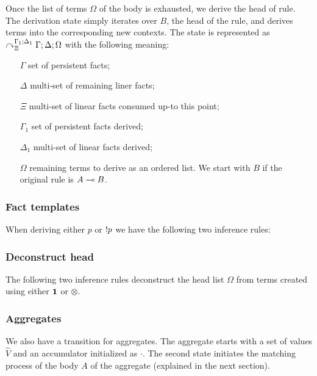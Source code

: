 Once the list of terms $\Omega$ of the body is exhausted, we derive the head of
rule.  The derivation state simply iterates over $B$, the head of the rule, and
derives terms into the corresponding new contexts. The state is represented as
$\curvearrowright_{\Xi}^{\Gamma_1; \Delta_1} \Gamma; \Delta; \Omega$ with the following meaning:

\begin{enumerate}
   \item[$\Gamma$] set of persistent facts;

   \item[$\Delta$] multi-set of remaining liner facts;

   \item[$\Xi$] multi-set of linear facts consumed up-to this point;

   \item[$\Gamma_1$] set of persistent facts derived;

   \item[$\Delta_1$] multi-set of linear facts derived;

   \item[$\Omega$] remaining terms to derive as an ordered list. We start with
   $B$ if the original rule is $A \multimap B$.

\end{enumerate}

\subsubsection{Fact templates}

When deriving either $p$ or ${!} p$ we have the following two inference rules:



\subsubsection{Deconstruct head}

The following two inference rules deconstruct the head list $\Omega$ from terms
created using either $\mathbf{1}$ or $\otimes$.



\subsubsection{Aggregates}

We also have a transition for aggregates. The aggregate starts with a set of
values $\widehat{V}$ and an accumulator initialized as $\cdot$. The second state
initiates the matching process of the body $A$ of the aggregate (explained in
the next section).

